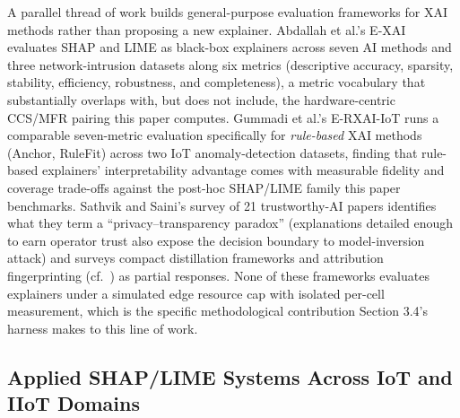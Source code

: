 A parallel thread of work builds general-purpose evaluation frameworks for XAI methods rather than proposing a new explainer. Abdallah et al.'s E-XAI \citep{ref35} evaluates SHAP and LIME as black-box explainers across seven AI methods and three network-intrusion datasets along six metrics (descriptive accuracy, sparsity, stability, efficiency, robustness, and completeness), a metric vocabulary that substantially overlaps with, but does not include, the hardware-centric CCS/MFR pairing this paper computes. Gummadi et al.'s E-RXAI-IoT \citep{ref21} runs a comparable seven-metric evaluation specifically for \emph{rule-based} XAI methods (Anchor, RuleFit) across two IoT anomaly-detection datasets, finding that rule-based explainers' interpretability advantage comes with measurable fidelity and coverage trade-offs against the post-hoc SHAP/LIME family this paper benchmarks. Sathvik and Saini's survey \citep{ref36} of 21 trustworthy-AI papers identifies what they term a ``privacy--transparency paradox'' (explanations detailed enough to earn operator trust also expose the decision boundary to model-inversion attack) and surveys compact distillation frameworks and attribution fingerprinting (cf.~\citep{ref27,ref33}) as partial responses. None of these frameworks evaluates explainers under a simulated edge resource cap with isolated per-cell measurement, which is the specific methodological contribution Section 3.4's harness makes to this line of work.

\subsection{Applied SHAP/LIME Systems Across IoT and IIoT Domains}\label{applied-shaplime-systems-across-iot-and-iiot-domains}

